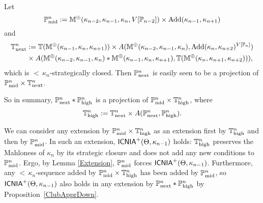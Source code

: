 \documentclass[a4paper]{amsart}
\theoremstyle{definition}
\theoremstyle{remark}
\theoremstyle{plain}
\numberwithin{mydef}{section}
\DeclareMathOperator{\Add}{Add}
\DeclareMathOperator{\ICNIA}{\textup{\textsf{ICNIA}}}
\newcommand{\dM}{\mathbb{M}}
\newcommand{\dP}{\mathbb{P}}
\newcommand{\dT}{\mathbb{T}}
\begin{document}
Let $$\dP_\textup{mid}^n:=\dM^{\oplus}(\kappa_{n-2},\kappa_{n-1},\kappa_n,V[\dP_{n-2}])\times\Add(\kappa_{n-1},\kappa_{n+1})$$
and
\begin{align*}
	\dT_\textup{next}^n & :=\dT(\dM^{\oplus}(\kappa_{n-1},\kappa_n,\kappa_{n+1}))\times A(\dM^{\oplus}(\kappa_{n-2},\kappa_{n-1},\kappa_n),\Add(\kappa_n,\kappa_{n+2})^{V[\dP_n]})\\
	& \times A(\dM^{\oplus}(\kappa_{n-2},\kappa_{n-1},\kappa_n)*\dM^{\oplus}(\kappa_{n-1},\kappa_n,\kappa_{n+1}),\dT(\dM^{\oplus}(\kappa_n,\kappa_{n+1},\kappa_{n+2}))),
\end{align*}
which is ${<}\,\kappa_n$-strategically closed.
Then $\dP_\textup{next}^n$ is easily seen to be a projection of $\dP_\textup{mid}^n\times\dT_\textup{next}^n$.

So in summary, $\dP_\textup{next}^n*\dP_\textup{high}^n$ is a projection of $\dP_\textup{mid}^n\times\dT_\textup{high}^n$, where
$$\dT_\textup{high}^n:=\dT_\textup{next}^n\times A(\dP_\textup{next}^n,\dP_\textup{high}^n).$$


We can consider any extension by $\dP_\textup{mid}^n\times\dT_\textup{high}^n$ as an extension first by $\dT_\textup{high}^n$ and then by $\dP_\textup{mid}^n$. In such an extension, $\ICNIA^+(\Theta,\kappa_{n-1})$ holds: $\dT_\textup{high}^n$ preserves the Mahloness of $\kappa_n$ by its strategic closure and does not add any new conditions to $\dP_\textup{mid}^n$. Ergo, by Lemma \ref{Extension}, $\dP_\textup{mid}^n$ forces $\ICNIA^+(\Theta,\kappa_{n-1})$. Furthermore, any ${<}\,\kappa_n$-sequence added by $\dP_\textup{mid}^n\times\dT_\textup{high}^n$ has been added by $\dP_\textup{mid}^n$, so $\ICNIA^+(\Theta,\kappa_{n-1})$ also holds in any extension by $\dP_\textup{next}^n*\dP_\textup{high}^n$ by Proposition~\autoref{ClubApprDown}.

\end{document}
